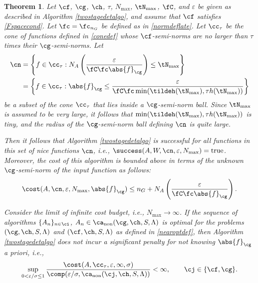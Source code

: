 \documentclass[]{elsarticle}
\DeclareMathOperator{\fix}{non}
\newtheorem{theorem}{Theorem}
\theoremstyle{definition}
\theoremstyle{remark}
\newcommand{\Gnorm}[1]{\abs{#1}_{\cg}}
\begin{document}
\begin{theorem}  \label{TwoStageDetermThm}  Let  $\cf$, $\cg$, $\ch$,  $\tau$, $N_{\max}$, $\tN_{\max}$, $\fC$, and $\varepsilon$ be given as described in Algorithm \ref{twostagedetalgo}, and assume that $\cf$ satisfies \eqref{Fspacecond}.  Let $\fc=\fc_{n_G}$ be defined as in \eqref{normdeflate}.
Let $\cc_\tau$ be the cone of functions defined in \eqref{conedef} whose $\cf$-semi-norms are no larger than $\tau$ times their $\cg$-semi-norms.  Let
\begin{align} 
\nonumber
\cn &= \left \{ f \in \cc_\tau : N_{A}\left(\frac{\varepsilon}{\fC \fc \Gnorm{f}} \right) \le \tN_{\max} \right\} \\
\label{nicefdef}
&= \left \{ f \in \cc_\tau : \Gnorm{f} \le \frac{\varepsilon}{\fC \fc \min(\tildeh(\tN_{\max}),\tau h(\tN_{\max}))} \right\}
\end{align}
be a subset of the cone $\cc_\tau$ that lies inside a $\cg$-semi-norm ball.  Since $\tN_{\max}$ is assumed to be very large, it follows that $\min(\tildeh(\tN_{\max}),\tau h(\tN_{\max}))$ is tiny, and the radius of the $\cg$-semi-norm ball defining $\cn$ is quite large. 

Then it follows that Algorithm \ref{twostagedetalgo} is successful for all functions in this set of \emph{nice} functions $\cn$,  i.e.,  $\success(A,W,\cn,\varepsilon,N_{\max}) = \text{true}$.  Moreover, the cost of this algorithm is bounded above in terms of the unknown $\cg$-semi-norm of the input function as follows:
\begin{equation} \label{auto2stagedetcost}
\cost(A,\cn,\varepsilon,N_{\max},\Gnorm{f})
\le n_G+ N_{A}\left(\frac{\varepsilon}{\fC \fc \Gnorm{f}} \right).
\end{equation}

Consider the limit of infinite cost budget, i.e., $N_{\max} \to \infty$.  If the sequence of algorithms $\{A_n\}_{n \in \ci}$, $A_n \in\ca_{\fix}(\cg,\ch,S,\Lambda)$  is optimal for the problems $(\cg,\ch,S,\Lambda)$ and $(\cf,\ch,S,\Lambda)$ as defined in \eqref{nearoptdef}, then Algorithm \ref{twostagedetalgo} does not incur a significant penalty for not knowing $\Gnorm{f}$ a priori, i.e.,
\begin{equation} \label{penalty}
\sup_{0 < \varepsilon/\sigma \le 1} \frac{\cost(A,\cc_{\tau},\varepsilon,\infty,\sigma)} {\comp(\varepsilon/\sigma,\ca_{\fix}(\cj,\ch,S,\Lambda))} <\infty, \qquad \cj \in \{\cf,\cg\}.
\end{equation}
\end{theorem}
\end{document}
